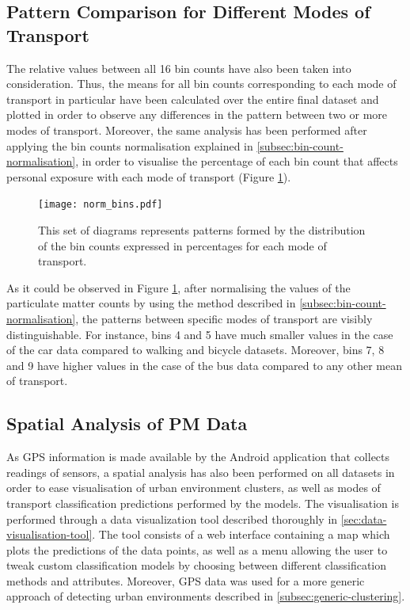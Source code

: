 \documentclass[bsc,frontabs,twoside,singlespacing,parskip,deptreport]{infthesis}     %
\begin{document}
\subsection{Pattern Comparison for Different Modes of Transport}

The relative values between all 16 bin counts have also been taken into consideration. Thus, the means for all bin counts corresponding to each mode of transport in particular have been calculated over the entire final dataset and plotted in order to observe any differences in the pattern between two or more modes of transport. Moreover, the same analysis has been performed after applying the bin counts normalisation explained in \ref{subsec:bin-count-normalisation}, in order to visualise the percentage of each bin count that affects personal exposure with each mode of transport (Figure \ref{fig:norm-bins}).

\begin{figure}[h!]
  \center
  \texttt{[image: norm\_bins.pdf]} 
  \caption{This set of diagrams represents patterns formed by the distribution of the bin counts expressed in percentages for each mode of transport.}
  \label{fig:norm-bins}
\end{figure}

As it could be observed in Figure \ref{fig:norm-bins}, after normalising the values of the particulate matter counts by using the method described in \ref{subsec:bin-count-normalisation}, the patterns between specific modes of transport are visibly distinguishable. For instance, bins 4 and 5 have much smaller values in the case of the car data compared to walking and bicycle datasets. Moreover, bins 7, 8 and 9 have higher values in the case of the bus data compared to any other mean of transport.

\subsection{Spatial Analysis of PM Data}

As GPS information is made available by the Android application that collects readings of sensors, a spatial analysis has also been performed on all datasets in order to ease visualisation of urban environment clusters, as well as modes of transport classification predictions performed by the models. The visualisation is performed through a data visualization tool described thoroughly in \ref{sec:data-visualisation-tool}. The tool consists of a web interface containing a map which plots the predictions of the data points, as well as a menu allowing the user to tweak custom classification models by choosing between different classification methods and attributes. Moreover, GPS data was used for a more generic approach of detecting urban environments described in \ref{subsec:generic-clustering}.
\end{document}

